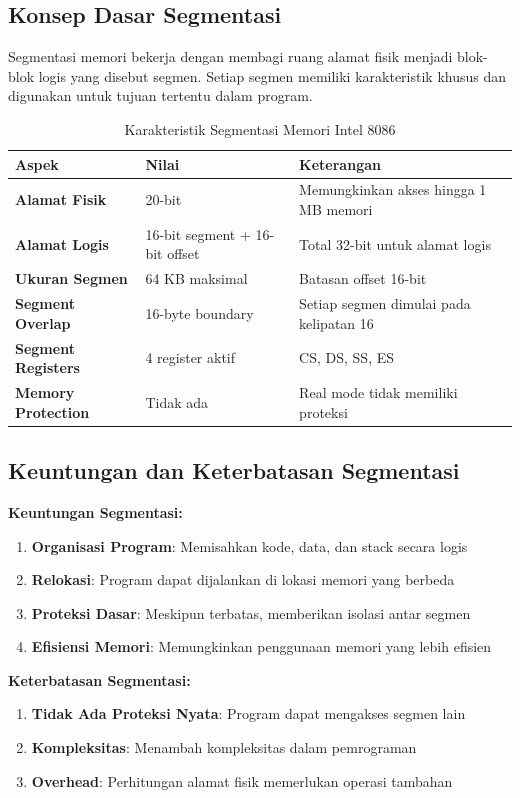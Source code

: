 \documentclass[../main.tex]{subfiles}
\begin{document}
\subsection{Konsep Dasar Segmentasi}
Segmentasi memori bekerja dengan membagi ruang alamat fisik menjadi blok-blok logis yang disebut segmen. Setiap segmen memiliki karakteristik khusus dan digunakan untuk tujuan tertentu dalam program.

\begin{table}[h]
\centering
\caption{Karakteristik Segmentasi Memori Intel 8086}
\begin{tabular}{|p{3cm}|p{4cm}|p{8cm}|}
\hline
\textbf{Aspek} & \textbf{Nilai} & \textbf{Keterangan} \\
\hline
\textbf{Alamat Fisik} & 20-bit & Memungkinkan akses hingga 1 MB memori \\
\hline
\textbf{Alamat Logis} & 16-bit segment + 16-bit offset & Total 32-bit untuk alamat logis \\
\hline
\textbf{Ukuran Segmen} & 64 KB maksimal & Batasan offset 16-bit \\
\hline
\textbf{Segment Overlap} & 16-byte boundary & Setiap segmen dimulai pada kelipatan 16 \\
\hline
\textbf{Segment Registers} & 4 register aktif & CS, DS, SS, ES \\
\hline
\textbf{Memory Protection} & Tidak ada & Real mode tidak memiliki proteksi \\
\hline
\end{tabular}
\label{tab:memory-segmentation-characteristics}
\end{table}

\subsection{Keuntungan dan Keterbatasan Segmentasi}
\textbf{Keuntungan Segmentasi:}
\begin{enumerate}
    \item \textbf{Organisasi Program}: Memisahkan kode, data, dan stack secara logis
    \item \textbf{Relokasi}: Program dapat dijalankan di lokasi memori yang berbeda
    \item \textbf{Proteksi Dasar}: Meskipun terbatas, memberikan isolasi antar segmen
    \item \textbf{Efisiensi Memori}: Memungkinkan penggunaan memori yang lebih efisien
\end{enumerate}

\textbf{Keterbatasan Segmentasi:}
\begin{enumerate}
    \item \textbf{Tidak Ada Proteksi Nyata}: Program dapat mengakses segmen lain
    \item \textbf{Kompleksitas}: Menambah kompleksitas dalam pemrograman
    \item \textbf{Overhead}: Perhitungan alamat fisik memerlukan operasi tambahan
\end{enumerate}
\end{document}

